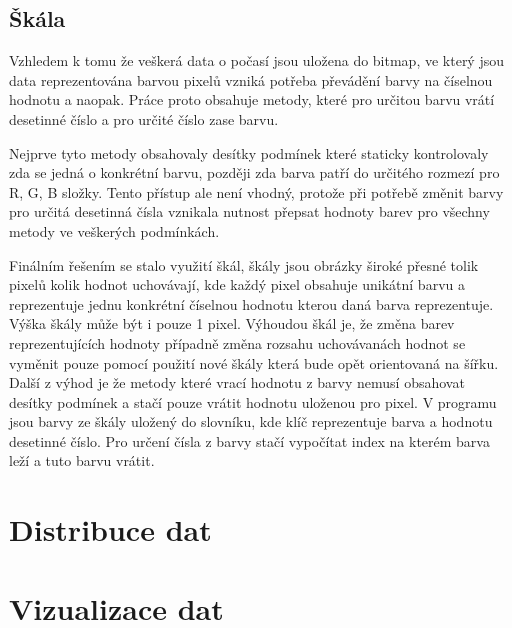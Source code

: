 \documentclass[czech,bachelor,dept460,male,csharp,cpdeclaration]{diploma}
\begin{document}
	\subsection{Škála}
	
	Vzhledem k tomu že veškerá data o počasí jsou uložena do bitmap, ve který jsou data reprezentována barvou pixelů vzniká potřeba převádění barvy na číselnou hodnotu a naopak. Práce proto obsahuje metody, které pro určitou barvu vrátí desetinné číslo a pro určité číslo zase barvu.
	
	Nejprve tyto metody obsahovaly desítky podmínek které staticky kontrolovaly zda se jedná o konkrétní barvu, později zda barva patří do určitého rozmezí pro R, G, B složky. Tento přístup ale není vhodný, protože při potřebě změnit barvy pro určitá desetinná čísla vznikala nutnost přepsat hodnoty barev pro všechny metody ve veškerých podmínkách.
	
	Finálním řešením se stalo využití škál, škály jsou obrázky široké přesné tolik pixelů kolik hodnot uchovávají, kde každý pixel obsahuje unikátní barvu a reprezentuje jednu konkrétní číselnou hodnotu kterou daná barva reprezentuje. Výška škály může být i pouze 1 pixel. Výhoudou škál je, že změna barev reprezentujících hodnoty případně změna rozsahu uchovávanách hodnot se vyměnit pouze pomocí použití nové škály která bude opět orientovaná na šířku. Další z výhod je že metody které vrací hodnotu z barvy nemusí obsahovat desítky podmínek a stačí pouze vrátit hodnotu uloženou pro pixel. V programu jsou barvy ze škály uložený do slovníku, kde klíč reprezentuje barva a hodnotu desetinné číslo. Pro určení čísla z barvy stačí vypočítat index na kterém barva leží a tuto barvu vrátit.
	
	\section{Distribuce dat}
	
	\section{Vizualizace dat}
	
\end{document}
